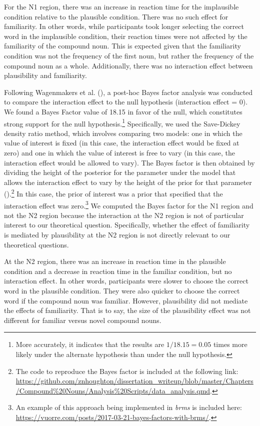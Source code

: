 \documentclass[
  12pt,
  letterpaper,
]{scrreport}
\begin{document}
For the N1 region, there was an increase in reaction time for the
implausible condition relative to the plausible condition. There was no
such effect for familiarity. In other words, while participants took
longer selecting the correct word in the implausible condition, their
reaction times were not affected by the familiarity of the compound
noun. This is expected given that the familiarity condition was not the
frequency of the first noun, but rather the frequency of the compound
noun as a whole. Additionally, there was no interaction effect between
plausibility and familiarity.

Following Wagenmakers et al.
(), a
post-hoc Bayes factor analysis was conducted to compare the interaction
effect to the null hypothesis (interaction effect = 0). We found a Bayes
Factor value of 18.15 in favor of the null, which constitutes strong
support for the null hypothesis.\footnote{More accurately, it indicates
  that the results are \(1/18.15=0.05\) times more likely under the
  alternate hypothesis than under the null hypothesis.} Specifically, we
used the Save-Dickey density ratio method, which involves comparing two
models: one in which the value of interest is fixed (in this case, the
interaction effect would be fixed at zero) and one in which the value of
interest is free to vary (in this case, the interaction effect would be
allowed to vary). The Bayes factor is then obtained by dividing the
height of the posterior for the parameter under the model that allows
the interaction effect to vary by the height of the prior for that
parameter
().\footnote{The code to reproduce the Bayes factor is included
  at the following link:
  \url{https://github.com/znhoughton/dissertation_writeup/blob/master/Chapters/Compound\%20Nouns/Analysis\%20Scripts/data_analysis.qmd}.}
In this case, the prior of interest was a prior that specified that the
interaction effect was zero.\footnote{An example of this approach being
  implemented in \emph{brms} is included here:
  \url{https://vuorre.com/posts/2017-03-21-bayes-factors-with-brms/}.}
We computed the Bayes factor for the N1 region and not the N2 region
because the interaction at the N2 region is not of particular interest
to our theoretical question. Specifically, whether the effect of
familiarity is mediated by plausibility at the N2 region is not directly
relevant to our theoretical questions.

At the N2 region, there was an increase in reaction time in the
plausible condition and a decrease in reaction time in the familiar
condition, but no interaction effect. In other words, participants were
slower to choose the correct word in the plausible condition. They were
also quicker to choose the correct word if the compound noun was
familiar. However, plausibility did not mediate the effects of
familiarity. That is to say, the size of the plausibility effect was not
different for familiar versus novel compound nouns.
\end{document}
